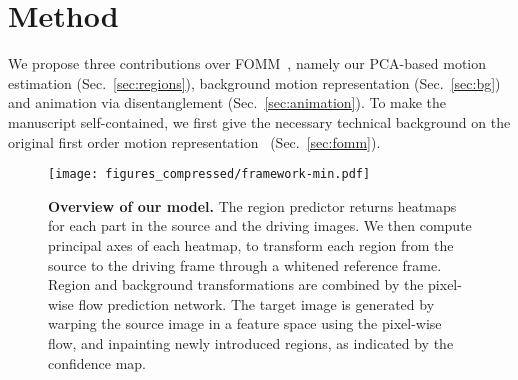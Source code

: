 \documentclass[final]{cvpr}
\begin{document}
\section{Method}
\label{sec:method}
\vspace{-0.2cm}
We propose three contributions over FOMM~\cite{fomm}, namely our PCA-based motion estimation (Sec.~\ref{sec:regions}), background motion representation (Sec.~\ref{sec:bg}) and animation via disentanglement (Sec.~\ref{sec:animation}). To make the manuscript self-contained, we first give the necessary technical background on the original first order motion representation~\cite{fomm} (Sec.~\ref{sec:fomm}). 























\begin{figure*}[t]
    \centering
    \texttt{[image: figures\_compressed/framework-min.pdf]}
    \vspace{-0.2cm}
    \caption{\textbf{Overview of our model.} The region predictor returns heatmaps for each part in the source and the driving images. We then compute principal axes of each heatmap, to transform each region from the source to the driving frame through a whitened reference frame. Region and background transformations are combined by the pixel-wise flow prediction network. The target image is generated by warping the source image in a feature space using the pixel-wise flow, and inpainting newly introduced regions, as indicated by the confidence map.}
    \label{fig:framework}
    \vspace{-0.4cm}
\end{figure*}

\newcommand{\nregions}{K}
\newcommand{\heatmap}{\mathbf{M}}
\newcommand{\heatmapval}{m}
\newcommand{\imcoord}{z}
\newcommand{\imcoordset}{\mathcal{Z}}
\newcommand{\affine}{A}
\newcommand{\imX}{\mathbf{X}}
\newcommand{\sourceframe}{\mathbf{S}}
\newcommand{\drivingframe}{\mathbf{D}}
\newcommand{\refframe}{\mathbf{R}}
\newcommand{\opticalflow}{\mathbf{O}}
\newcommand{\assignment}{\mathbf{W}}
\newcommand{\confidence}{\mathbf{C}}
\newcommand{\DtoS}{{\sourceframe \leftarrow \drivingframe}}
\newcommand{\RtoX}{{\imX \leftarrow \refframe}}
\newcommand{\RtoS}{{\sourceframe \leftarrow \refframe}}
\newcommand{\RtoD}{{\drivingframe \leftarrow \refframe}}
\newcommand{\covar}{\Sigma}
\newcommand{\mean}{\mu}
\renewcommand{\angle}{\theta}
\newcommand{\U}{U}
\renewcommand{\S}{S}
\newcommand{\V}{V}
\newcommand{\rot}{R}
\renewcommand{\covar}{\Sigma}
\end{document}
